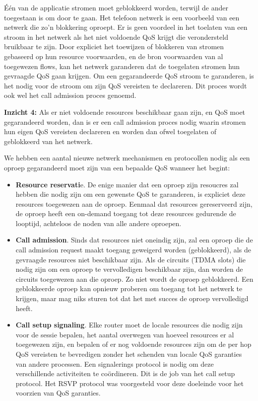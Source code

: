 \noindent Één van de applicatie stromen moet geblokkeerd worden, terwijl de ander toegestaan is om door te gaan. Het telefoon netwerk is een voorbeeld van een netwerk die zo’n blokkering oproept. Er is geen voordeel in het toelaten van een stroom in het netwerk als het niet voldoende QoS krijgt die verondersteld bruikbaar te zijn. Door expliciet het toewijzen of blokkeren van stromen gebaseerd op hun resource voorwaarden, en de bron voorwaarden van al toegewezen flows, kan het netwerk garanderen dat de toegelaten stromen hun gevraagde QoS gaan krijgen. Om een gegarandeerde QoS stroom te garanderen, is het nodig voor de stroom om zijn QoS vereisten te declareren. Dit proces wordt ook wel het call admission proces genoemd.

\noindent \textbf{Inzicht 4:} Als er niet voldoende resources beschikbaar gaan zijn, en QoS moet gegarandeerd worden, dan is er een call admission proces nodig waarin stromen hun eigen QoS vereisten declareren en worden dan ofwel toegelaten of geblokkeerd van het netwerk.

\noindent We hebben een aantal nieuwe netwerk mechanismen en protocollen nodig als een oproep gegarandeerd moet zijn van een bepaalde QoS wanneer het begint:

\begin{itemize}
\item \textbf{Resource reservati}e. De enige manier dat een oproep zijn resoucres zal hebben die nodig zijn om een gewenste QoS te garanderen, is expliciet deze resources toegewezen aan de oproep. Eenmaal dat resources gereserveerd zijn, de oproep heeft een on-demand toegang tot deze resources gedurende de looptijd, achteloos de noden van alle andere oproepen.
\item \textbf{Call admission}. Sinds dat resources niet oneindig zijn, zal een oproep die de call admission request maakt toegang geweigerd worden (geblokkeerd), als de gevraagde resources niet beschikbaar zijn. Als de circuits (TDMA slots) die nodig zijn om een oproep te vervolledigen beschikbaar zijn, dan worden de circuits toegewezen aan die oproep. Zo niet wordt de oproep geblokkeerd. Een geblokkeerde oproep kan opnieuw proberen om toegang tot het netwerk te krijgen, maar mag niks sturen tot dat het met succes de oproep vervolledigd heeft.
\item \textbf{ Call setup signaling}. Elke router moet de locale resources die nodig zijn voor de sessie bepalen, het aantal overwegen van hoeveel resources er al toegewezen zijn, en bepalen of er nog voldoende resources zijn om de per hop QoS vereisten te bevredigen zonder het schenden van locale QoS garanties van andere processen. Een signalerings protocol is nodig om deze verschillende activiteiten te coördineren. Dit is de job van het call setup protocol. Het RSVP protocol was voorgesteld voor deze doeleinde voor het voorzien van QoS garanties.
\end{itemize}

